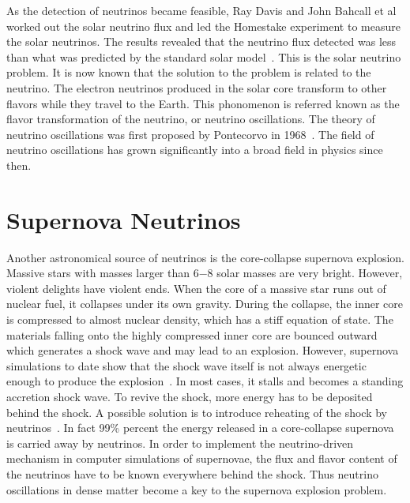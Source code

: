 As the detection of neutrinos became feasible, Ray Davis and John Bahcall et al worked out the solar neutrino flux and led the Homestake experiment to measure the solar neutrinos. The results revealed that the neutrino flux detected was less than what was predicted by the standard solar model~\cite{Bahcall1973}. This is the solar neutrino problem. It is now known that the solution to the problem is related to the neutrino. The electron neutrinos produced in the solar core transform to other flavors while they travel to the Earth. This phonomenon is referred known as the flavor transformation of the neutrino, or neutrino oscillations. The theory of neutrino oscillations was first proposed by Pontecorvo in 1968~\cite{Pontecorvo1968}. The field of neutrino oscillations has grown significantly into a broad field in physics since then.



\section{Supernova Neutrinos}


Another astronomical source of neutrinos is the core-collapse supernova explosion. Massive stars with masses larger than 6−8 solar masses are very bright. However, violent delights have violent ends. When the core of a massive star runs out of nuclear fuel, it collapses under its own gravity. During the collapse, the inner core is compressed to almost nuclear density, which has a stiff equation of state. The materials falling onto the highly compressed inner core are bounced outward which generates a shock wave and may lead to an explosion. However, supernova simulations to date show that the shock wave itself is not always energetic enough to produce the explosion~\cite{Janka2016b}. In most cases, it stalls and becomes a standing accretion shock wave. To revive the shock, more energy has to be deposited behind the shock. A possible solution is to introduce reheating of the shock by neutrinos~\cite{Janka2016b}. In fact 99\% percent the energy released in a core-collapse supernova is carried away by neutrinos.
In order to implement the neutrino-driven mechanism in computer simulations of supernovae, the flux and flavor content of the neutrinos have to be known everywhere behind the shock. Thus neutrino oscillations in dense matter become a key to the supernova explosion problem.

